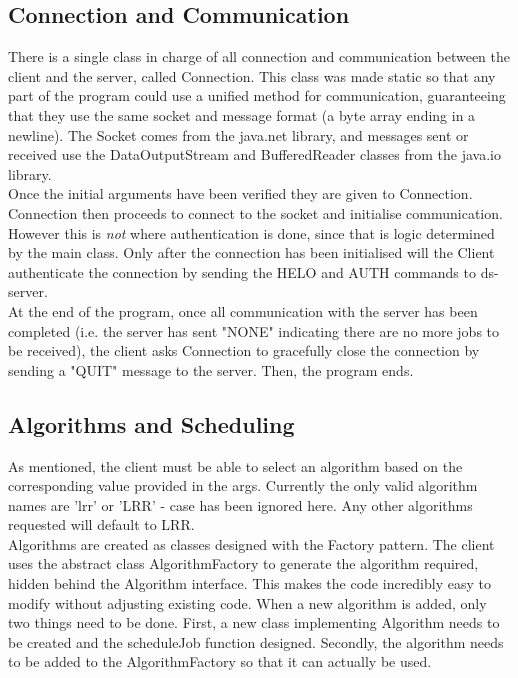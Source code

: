 \subsection{Connection and Communication}
There is a single class in charge of all connection and communication between the client and the server, called Connection. This class was made static so that any part of the program could use a unified method for communication, guaranteeing that they use the same socket and message format (a byte array ending in a newline). The Socket comes from the java.net library, and messages sent or received use the DataOutputStream and BufferedReader classes from the java.io library. \\

\vspace{.2cm}
Once the initial arguments have been verified they are given to Connection. Connection then proceeds to connect to the socket and initialise communication. However this is \textit{not} where authentication is done, since that is logic determined by the main class. Only after the connection has been initialised will the Client authenticate the connection by sending the HELO and AUTH commands to ds-server. \\

\vspace{.2cm}
At the end of the program, once all communication with the server has been completed (i.e. the server has sent "NONE" indicating there are no more jobs to be received), the client asks Connection to gracefully close the connection by sending a "QUIT" message to the server. Then, the program ends.

\newpage
\subsection{Algorithms and Scheduling}
As mentioned, the client must be able to select an algorithm based on the corresponding value provided in the args. Currently the only valid algorithm names are 'lrr' or 'LRR' - case has been ignored here. Any other algorithms requested will default to LRR. \\ 

\vspace{.2cm}
Algorithms are created as classes designed with the Factory pattern. The client uses the abstract class AlgorithmFactory to generate the algorithm required, hidden behind the Algorithm interface. This makes the code incredibly easy to modify without adjusting existing code. When a new algorithm is added, only two things need to be done. First, a new class implementing Algorithm needs to be created and the scheduleJob function designed. Secondly, the algorithm needs to be added to the AlgorithmFactory so that it can actually be used. \\

